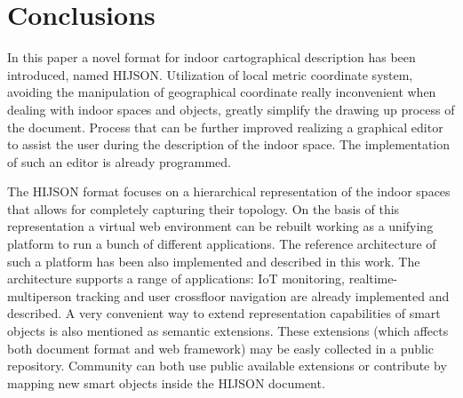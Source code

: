 \section{Conclusions}\label{conclusions}

In this paper a novel format for indoor cartographical description has been introduced, named HIJSON. Utilization of local metric coordinate system, avoiding the manipulation of geographical coordinate really inconvenient when dealing with indoor spaces and objects, greatly simplify the drawing up process of the document. Process that can be further improved realizing a graphical editor to assist the user during the description of the indoor space. The implementation of such an editor is already programmed.

The HIJSON format focuses on a hierarchical representation of the indoor spaces that allows for completely capturing their topology. On the basis of this representation a virtual web environment can be rebuilt working as a unifying platform to run a bunch of different applications. The reference architecture of such a platform has been also implemented and described in this work. The architecture supports a range of applications: IoT monitoring, realtime-multiperson tracking and user crossfloor navigation are already implemented and described. A very convenient way to extend representation capabilities of smart objects is also mentioned as semantic extensions. These extensions (which affects both document format and web framework) may be easly collected in a public repository. Community can both use public available extensions or contribute by mapping new smart objects inside the HIJSON document.
